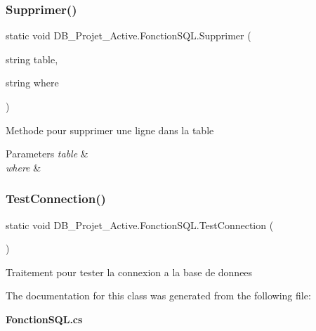 \subsubsection{Supprimer()}
{\footnotesize\ttfamily static void D\+B\+\_\+\+Projet\+\_\+\+Active.\+Fonction\+S\+Q\+L.\+Supprimer (\begin{DoxyParamCaption}\item[{string}]{table,  }\item[{string}]{where }\end{DoxyParamCaption})\hspace{0.3cm}{\ttfamily [static]}}



Methode pour supprimer une ligne dans la table 


\begin{DoxyParams}{Parameters}
{\em table} & \\
\hline
{\em where} & \\
\hline
\end{DoxyParams}
\mbox{\label{class_d_b___projet___active_1_1_fonction_s_q_l_af4ac902eb2180f5eebb7e81fd20978ba}} 
\subsubsection{TestConnection()}
{\footnotesize\ttfamily static void D\+B\+\_\+\+Projet\+\_\+\+Active.\+Fonction\+S\+Q\+L.\+Test\+Connection (\begin{DoxyParamCaption}{ }\end{DoxyParamCaption})\hspace{0.3cm}{\ttfamily [static]}}



Traitement pour tester la connexion a la base de donnees 



The documentation for this class was generated from the following file\+:\begin{DoxyCompactItemize}
\item 
\textbf{ Fonction\+S\+Q\+L.\+cs}\end{DoxyCompactItemize}
